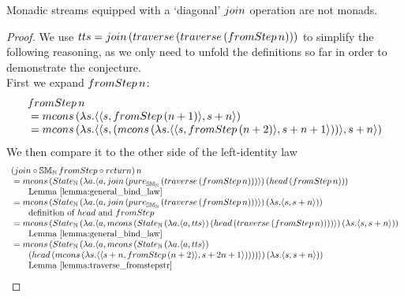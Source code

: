 \begin{theorem}\label{lemma:monad_counterexample}
Monadic streams equipped with a `diagonal' $\join$ operation are not monads.
\end{theorem}
\begin{proof}
We use $tts = \join\, (\traverse\, (\traverse\, (\fromstepstr\, n)))$ to simplify the following reasoning, as we only need to unfold the definitions so far in order to demonstrate the conjecture. \\

First we expand $\fromstepstr\, n$:
$$
\begin{array}{ll}
\fromstepstr\, n \\
{}= \mcons\, (\lambda s. \pair{\pair{s}{\fromstepstr\, (n + 1)}}{s + n})\\
{}= \mcons\, (\lambda s. \pair{\pair{s}{(\mcons\, (\lambda s. \pair{\pair{s}{\fromstepstr\, (n + 2)}}{s + n + 1}))}}{s + n}) \\
\end{array} 
$$
We then compare it to the other side of the left-identity law
$$
\begin{array}{l}
(\join \comp  \stmon{\nat}\, \fromstepstr \comp \return)\, n \\
{}= \mcons\, (\state_{\nat} \,(\lambda a . \pair{a}{\join\, (\apure_{\stmon{\nat}}\, (\traverse\, (\fromstepstr\, n)))})\, (\head\, (\fromstepstr\, n))) \\
 \qquad\mbox{Lemma \ref{lemma:general_bind_law}}  \\
{}= \mcons\, (\state_{\nat}\,(\lambda a . \pair{a}{\join\, (\apure_{\stmon{\nat}}\,(\traverse\, (\fromstepstr\, n)))})\, (\lambda s. \pair{s}{s + n})) \\
 \qquad\mbox{definition of } \head \mbox{ and } \fromstepstr \\
{}= \mcons\, (\state_{\nat}\,(\lambda a . \pair{a}{  
\mcons\, (\state_{\nat} \,(\lambda a . \pair{a}{tts})\, (\head\, (\traverse\, (\fromstepstr\, n))))
})\, (\lambda s. \pair{s}{s + n})) \\
 \qquad\mbox{Lemma \ref{lemma:general_bind_law}}\\
{}= \mcons\, (\state_{\nat}\,(\lambda a . \pair{a}{  
\mcons\, (\state_{\nat} \,(\lambda a . \pair{a}{tts})\, \\\qquad(\head\, (\mcons\, (\lambda s . \pair{\pair{s+n}{\fromstepstr\, (n + 2)}}{s + 2n + 1}))))
})\, (\lambda s. \pair{s}{s + n})) \\
 \qquad\mbox{Lemma \ref{lemma:traverse_fromstepstr}}\\

\end{array}$$
\end{proof}
